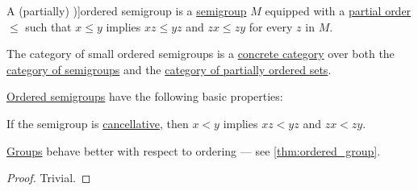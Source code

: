 \begin{definition}\label{def:ordered_semigroup}
  A (partially) \term[ru=частично упорядоченная полугруппа (\cite[535]{Ляпин1960Полугруппы})]{ordered semigroup} is a \hyperref[def:semigroup]{semigroup} \( M \) equipped with a \hyperref[def:partially_ordered_set]{partial order} \( \leq \) such that \( x \leq y \) implies \( xz \leq yz \) and \( zx \leq zy \) for every \( z \) in \( M \).
\end{definition}
\begin{comments}
  \item The category of small ordered semigroups is a \hyperref[def:concrete_category]{concrete category} over both the \hyperref[def:semigroup/category]{category of semigroups} and the \hyperref[def:partially_ordered_set]{category of partially ordered sets}.
\end{comments}

\begin{proposition}\label{thm:def:ordered_semigroup}
  \hyperref[def:ordered_semigroup]{Ordered semigroups} have the following basic properties:
  \begin{thmenum}
     If the semigroup is \hyperref[def:binary_operation/cancellative]{cancellative}, then \( x < y \) implies \( xz < yz \) and \( zx < zy \).
  \end{thmenum}
\end{proposition}
\begin{comments}
  \item \hyperref[def:group]{Groups} behave better with respect to ordering --- see \cref{thm:ordered_group}.
\end{comments}
\begin{proof}
   Trivial.
\end{proof}


